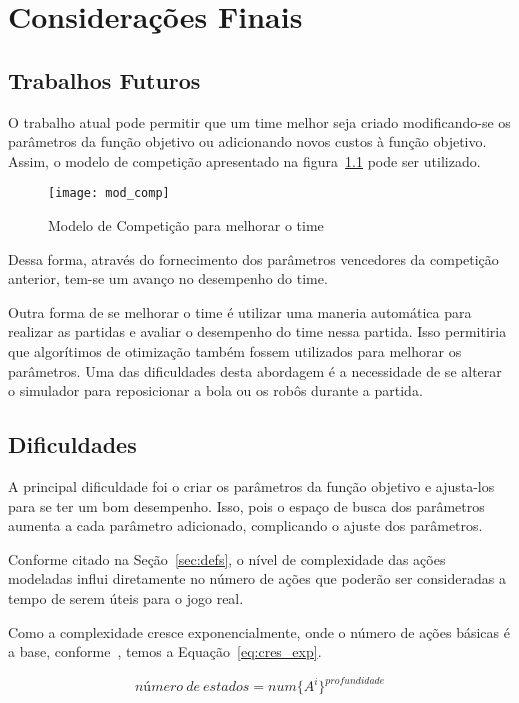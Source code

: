 \chapter{Considerações Finais}\label{cap:cons_finais}

\section{Trabalhos Futuros}

O trabalho atual pode permitir que um time melhor
seja criado modificando-se os parâmetros da função
objetivo ou adicionando novos custos à função objetivo.
Assim, o modelo de competição apresentado na
figura~\ref{fig:mod_comp} pode ser utilizado.

\begin{figure}[H]
  \centering
  \texttt{[image: mod\_comp]}
  \caption{Modelo de Competição para melhorar
           o time}\label{fig:mod_comp}
\end{figure}

Dessa forma, através do fornecimento dos parâmetros
vencedores da competição anterior, tem-se um avanço
no desempenho do time.

Outra forma de se melhorar o time é utilizar uma
maneria automática para realizar as partidas e
avaliar o desempenho do time nessa partida. Isso
permitiria que algorítimos de otimização também
fossem utilizados para melhorar os parâmetros.
Uma das dificuldades desta abordagem é a necessidade
de se alterar o simulador para reposicionar a bola
ou os robôs durante a partida.
 
\section{Dificuldades}

A principal dificuldade foi o criar os parâmetros da função objetivo
e ajusta-los para se ter um bom desempenho. Isso, pois o espaço
de busca dos parâmetros aumenta a cada parâmetro adicionado, complicando
o ajuste dos parâmetros.

Conforme citado na Seção~\ref{sec:defs}, o nível de complexidade das ações
modeladas influi diretamente no número de
ações que poderão ser consideradas a tempo de serem úteis para o jogo real.

Como a complexidade cresce exponencialmente, onde o número de ações básicas é
a base, conforme~\cite{russell2003artificial}, temos a Equação~\ref{eq:cres_exp}.

\begin{dmath}\label{eq:cres_exp}
 número{\ }de{\ }estados = num \lbrace A^i \rbrace ^{profundidade}
\end{dmath}

